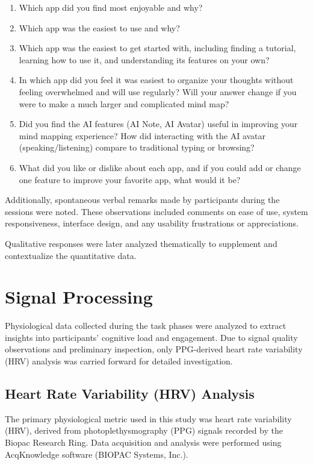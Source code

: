\documentclass{CPP}
\begin{document}
\begin{enumerate}
    \item Which app did you find most enjoyable and why?
    \item Which app was the easiest to use and why?
    \item Which app was the easiest to get started with, including finding a tutorial, learning how to use it, and understanding its features on your own?
    \item In which app did you feel it was easiest to organize your thoughts without feeling overwhelmed and will use regularly? Will your answer change if you were to make a much larger and complicated mind map?
    \item Did you find the AI features (AI Note, AI Avatar) useful in improving your mind mapping experience? How did interacting with the AI avatar (speaking/listening) compare to traditional typing or browsing?
    \item What did you like or dislike about each app, and if you could add or change one feature to improve your favorite app, what would it be?
\end{enumerate}

Additionally, spontaneous verbal remarks made by participants during the sessions were noted. These observations included comments on ease of use, system responsiveness, interface design, and any usability frustrations or appreciations.

Qualitative responses were later analyzed thematically to supplement and contextualize the quantitative data.

\section{Signal Processing}

Physiological data collected during the task phases were analyzed to extract insights into participants’ cognitive load and engagement. Due to signal quality observations and preliminary inspection, only PPG-derived heart rate variability (HRV) analysis was carried forward for detailed investigation.

\subsection{Heart Rate Variability (HRV) Analysis}

The primary physiological metric used in this study was heart rate variability (HRV), derived from photoplethysmography (PPG) signals recorded by the Biopac Research Ring. Data acquisition and analysis were performed using AcqKnowledge software (BIOPAC Systems, Inc.).
\end{document}
